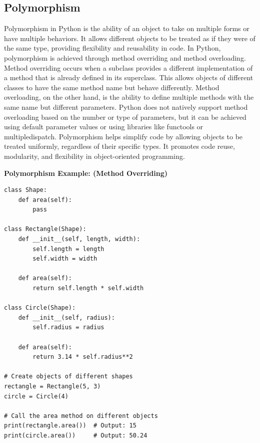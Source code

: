 \documentclass{report}
\begin{document}
    \subsection{Polymorphism}
    \bigbreak \noindent 
    Polymorphism in Python is the ability of an object to take on multiple forms or have multiple behaviors. It allows different objects to be treated as if they were of the same type, providing flexibility and reusability in code.
    \bigbreak \noindent 
    In Python, polymorphism is achieved through method overriding and method overloading. Method overriding occurs when a subclass provides a different implementation of a method that is already defined in its superclass. This allows objects of different classes to have the same method name but behave differently.
    \bigbreak \noindent 
    Method overloading, on the other hand, is the ability to define multiple methods with the same name but different parameters. Python does not natively support method overloading based on the number or type of parameters, but it can be achieved using default parameter values or using libraries like functools or multipledispatch.
    \bigbreak \noindent 
    Polymorphism helps simplify code by allowing objects to be treated uniformly, regardless of their specific types. It promotes code reuse, modularity, and flexibility in object-oriented programming.
    \bigbreak \noindent 

    \pagebreak \bigbreak \noindent
    \begin{mdframed}
        \textbf{Polymorphism Example: (Method Overriding)}
        \begin{verbatim}
class Shape:
    def area(self):
        pass

class Rectangle(Shape):
    def __init__(self, length, width):
        self.length = length
        self.width = width
    
    def area(self):
        return self.length * self.width

class Circle(Shape):
    def __init__(self, radius):
        self.radius = radius
    
    def area(self):
        return 3.14 * self.radius**2

# Create objects of different shapes
rectangle = Rectangle(5, 3)
circle = Circle(4)

# Call the area method on different objects
print(rectangle.area())  # Output: 15
print(circle.area())     # Output: 50.24
        \end{verbatim}
    \end{mdframed}
\end{document}
